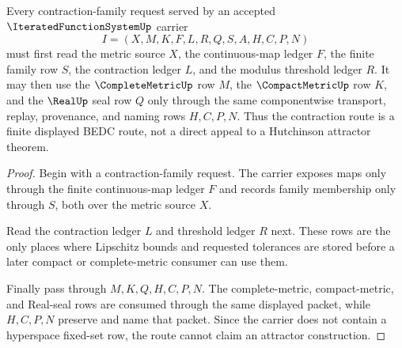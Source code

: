 \begin{theorem}
\label{thm:iterated-function-system-contraction-route}
Every contraction-family request served by an accepted $\IteratedFunctionSystemUp$ carrier
$$
I=(X,M,K,F,L,R,Q,S,A,H,C,P,N)
$$
must first read the metric source $X$, the continuous-map ledger $F$, the finite family row $S$, the contraction ledger $L$, and the modulus threshold ledger $R$. It may then use the $\CompleteMetricUp$ row $M$, the $\CompactMetricUp$ row $K$, and the $\RealUp$ seal row $Q$ only through the same componentwise transport, replay, provenance, and naming rows $H,C,P,N$. Thus the contraction route is a finite displayed BEDC route, not a direct appeal to a Hutchinson attractor theorem.
\end{theorem}
\begin{proof}
Begin with a contraction-family request. The carrier exposes maps only through the finite continuous-map ledger $F$ and records family membership only through $S$, both over the metric source $X$.

Read the contraction ledger $L$ and threshold ledger $R$ next. These rows are the only places where Lipschitz bounds and requested tolerances are stored before a later compact or complete-metric consumer can use them.

Finally pass through $M,K,Q,H,C,P,N$. The complete-metric, compact-metric, and Real-seal rows are consumed through the same displayed packet, while $H,C,P,N$ preserve and name that packet. Since the carrier does not contain a hyperspace fixed-set row, the route cannot claim an attractor construction.
\end{proof}


\begin{closurestatus}{\IteratedFunctionSystemUp}
  \theoryclosure{\seedClosure}
  \formalstatus{\unformalizedV}
\end{closurestatus}
